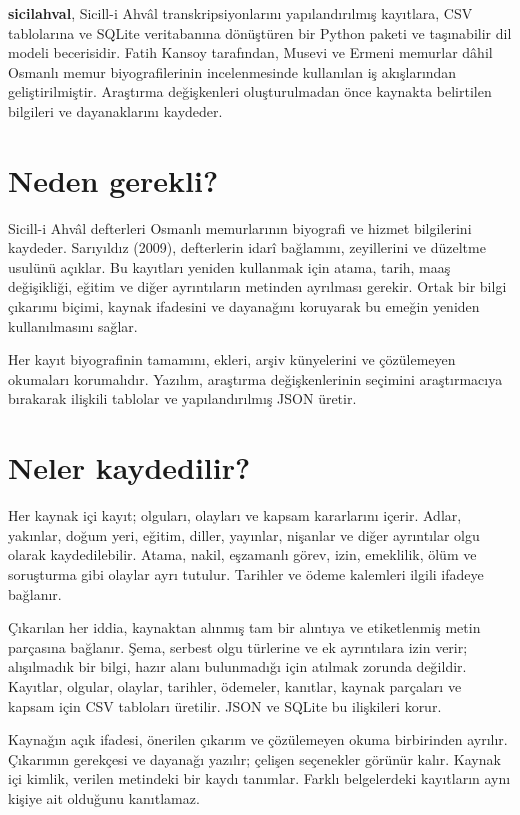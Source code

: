\documentclass[11pt,a4paper]{article}
\begin{document}

\textbf{sicilahval}, Sicill-i Ahvâl transkripsiyonlarını yapılandırılmış kayıtlara, CSV tablolarına ve SQLite veritabanına dönüştüren bir Python paketi ve taşınabilir dil modeli becerisidir. Fatih Kansoy tarafından, Musevi ve Ermeni memurlar dâhil Osmanlı memur biyografilerinin incelenmesinde kullanılan iş akışlarından geliştirilmiştir. Araştırma değişkenleri oluşturulmadan önce kaynakta belirtilen bilgileri ve dayanaklarını kaydeder.

\section{Neden gerekli?}
Sicill-i Ahvâl defterleri Osmanlı memurlarının biyografi ve hizmet bilgilerini kaydeder. Sarıyıldız (2009), defterlerin idarî bağlamını, zeyillerini ve düzeltme usulünü açıklar. Bu kayıtları yeniden kullanmak için atama, tarih, maaş değişikliği, eğitim ve diğer ayrıntıların metinden ayrılması gerekir. Ortak bir bilgi çıkarımı biçimi, kaynak ifadesini ve dayanağını koruyarak bu emeğin yeniden kullanılmasını sağlar.

Her kayıt biyografinin tamamını, ekleri, arşiv künyelerini ve çözülemeyen okumaları korumalıdır. Yazılım, araştırma değişkenlerinin seçimini araştırmacıya bırakarak ilişkili tablolar ve yapılandırılmış JSON üretir.

\section{Neler kaydedilir?}
Her kaynak içi kayıt; olguları, olayları ve kapsam kararlarını içerir. Adlar, yakınlar, doğum yeri, eğitim, diller, yayınlar, nişanlar ve diğer ayrıntılar olgu olarak kaydedilebilir. Atama, nakil, eşzamanlı görev, izin, emeklilik, ölüm ve soruşturma gibi olaylar ayrı tutulur. Tarihler ve ödeme kalemleri ilgili ifadeye bağlanır.

Çıkarılan her iddia, kaynaktan alınmış tam bir alıntıya ve etiketlenmiş metin parçasına bağlanır. Şema, serbest olgu türlerine ve ek ayrıntılara izin verir; alışılmadık bir bilgi, hazır alanı bulunmadığı için atılmak zorunda değildir. Kayıtlar, olgular, olaylar, tarihler, ödemeler, kanıtlar, kaynak parçaları ve kapsam için CSV tabloları üretilir. JSON ve SQLite bu ilişkileri korur.

Kaynağın açık ifadesi, önerilen çıkarım ve çözülemeyen okuma birbirinden ayrılır. Çıkarımın gerekçesi ve dayanağı yazılır; çelişen seçenekler görünür kalır. Kaynak içi kimlik, verilen metindeki bir kaydı tanımlar. Farklı belgelerdeki kayıtların aynı kişiye ait olduğunu kanıtlamaz.
\end{document}
